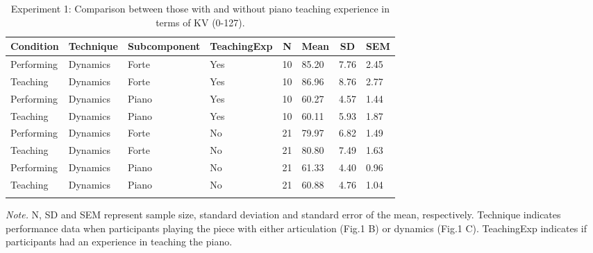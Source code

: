 \documentclass[
  man,floatsintext]{apa6}
\begin{document}
\begin{table}[tbp]

\begin{center}
\begin{threeparttable}

\caption{\label{tab:dyn-teaching-desc-1}Experiment 1: Comparison between those with and without piano teaching experience in terms of KV (0-127).}

\begin{tabular}{llllllll}
\toprule
Condition & \multicolumn{1}{c}{Technique} & \multicolumn{1}{c}{Subcomponent} & \multicolumn{1}{c}{TeachingExp} & \multicolumn{1}{c}{N} & \multicolumn{1}{c}{Mean} & \multicolumn{1}{c}{SD} & \multicolumn{1}{c}{SEM}\\
\midrule
Performing & Dynamics & Forte & Yes & 10 & 85.20 & 7.76 & 2.45\\
Teaching & Dynamics & Forte & Yes & 10 & 86.96 & 8.76 & 2.77\\
Performing & Dynamics & Piano & Yes & 10 & 60.27 & 4.57 & 1.44\\
Teaching & Dynamics & Piano & Yes & 10 & 60.11 & 5.93 & 1.87\\
Performing & Dynamics & Forte & No & 21 & 79.97 & 6.82 & 1.49\\
Teaching & Dynamics & Forte & No & 21 & 80.80 & 7.49 & 1.63\\
Performing & Dynamics & Piano & No & 21 & 61.33 & 4.40 & 0.96\\
Teaching & Dynamics & Piano & No & 21 & 60.88 & 4.76 & 1.04\\
\bottomrule
\addlinespace
\end{tabular}

\begin{tablenotes}[para]
\normalsize{\textit{Note.} N, SD and SEM represent sample size, standard deviation and standard error of the mean, respectively. Technique indicates performance data when participants playing the piece with either articulation (Fig.1 B) or dynamics (Fig.1 C). TeachingExp indicates if participants had an experience in teaching the piano.}
\end{tablenotes}

\end{threeparttable}
\end{center}

\end{table}
\end{document}
